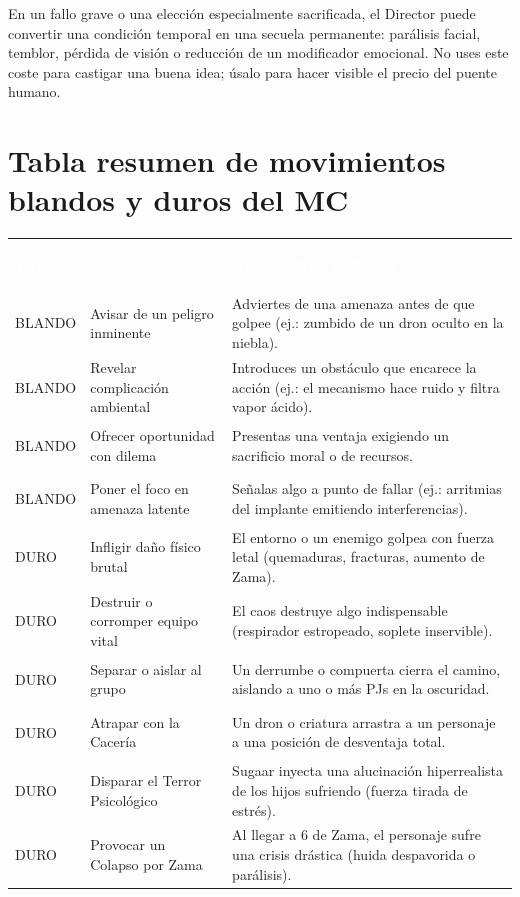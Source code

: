  En un fallo grave o una elección especialmente sacrificada, el Director puede convertir una condición temporal en una secuela permanente: parálisis facial, temblor, pérdida de visión o reducción de un modificador emocional. No uses este coste para castigar una buena idea; úsalo para hacer visible el precio del puente humano.

\section{Tabla resumen de movimientos blandos y duros del MC}

{\small
\setlength{\tabcolsep}{4pt}
\noindent\begin{tabular}{@{}>{\sffamily\bfseries\raggedright\arraybackslash}p{.12\linewidth}>{\raggedright\arraybackslash}p{.26\linewidth}>{\raggedright\arraybackslash}p{.48\linewidth}@{}}
\rowcolor{CarbonDark}\textcolor{white}{\sffamily\bfseries Tipo} & \textcolor{white}{\sffamily\bfseries Movimiento} & \textcolor{white}{\sffamily\bfseries Aplicación en la ficción} \\
\textcolor{BurdinUrdin}{BLANDO} & Avisar de un peligro inminente & Adviertes de una amenaza antes de que golpee (ej.: zumbido de un dron oculto en la niebla). \\
\textcolor{BurdinUrdin}{BLANDO} & Revelar complicación ambiental & Introduces un obstáculo que encarece la acción (ej.: el mecanismo hace ruido y filtra vapor ácido). \\
\textcolor{BurdinUrdin}{BLANDO} & Ofrecer oportunidad con dilema & Presentas una ventaja exigiendo un sacrificio moral o de recursos. \\
\textcolor{BurdinUrdin}{BLANDO} & Poner el foco en amenaza latente & Señalas algo a punto de fallar (ej.: arritmias del implante emitiendo interferencias). \\
\textcolor{OrekakRust}{DURO} & Infligir daño físico brutal & El entorno o un enemigo golpea con fuerza letal (quemaduras, fracturas, aumento de Zama). \\
\textcolor{OrekakRust}{DURO} & Destruir o corromper equipo vital & El caos destruye algo indispensable (respirador estropeado, soplete inservible). \\
\textcolor{OrekakRust}{DURO} & Separar o aislar al grupo & Un derrumbe o compuerta cierra el camino, aislando a uno o más PJs en la oscuridad. \\
\textcolor{OrekakRust}{DURO} & Atrapar con la Cacería & Un dron o criatura arrastra a un personaje a una posición de desventaja total. \\
\textcolor{OrekakRust}{DURO} & Disparar el Terror Psicológico & Sugaar inyecta una alucinación hiperrealista de los hijos sufriendo (fuerza tirada de estrés). \\
\textcolor{OrekakRust}{DURO} & Provocar un Colapso por Zama & Al llegar a 6 de Zama, el personaje sufre una crisis drástica (huida despavorida o parálisis). \\
\end{tabular}}

